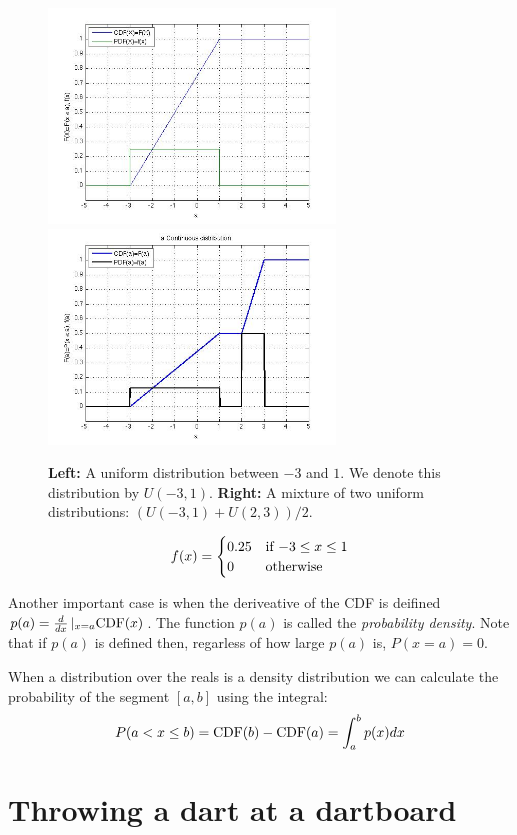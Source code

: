 \begin{figure}[t]
\begin{center}
\includegraphics[width=3in]{figs/Uniform.jpg}
\includegraphics[width=3in]{figs/unifMixture2CDF.jpg}
\end{center}
\caption{{\bf Left:} A uniform distribution between $-3$ and $1$. We
  denote this distribution by $U(-3,1)$. {\bf Right:} A mixture of two
  uniform distributions: $(U(-3,1)+U(2,3))/2$.}
\end{figure}

\[
f(x) = \begin{cases}
0.25 & \mbox{if $ -3 \leq x \leq 1$} \\
0 & \mbox{otherwise}
\end{cases}
\]

Another important case is when the deriveative of the CDF is deifined
$p(a) = \frac{d}{dx}\left|_{x=a} \mbox{CDF}(x)\right.$. The function $p(a)$
is called the {\em probability density}. Note that if $p(a)$ is
defined then, regarless of how large $p(a)$ is, $P(x=a)=0$.

When a distribution over the reals is a density distribution we can
calculate the probability of the segment $[a,b]$ using the integral:
\[
P(a < x \leq b)=\mbox{CDF}(b)-\mbox{CDF}(a)=\int_a^b p(x) dx
\]

\section{Throwing a dart at a dartboard} 

